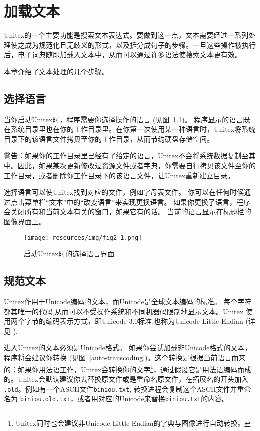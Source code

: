 \chapter{加载文本}
\label{chap-text}

\noindent Unitex的一个主要功能是搜索文本表达式。要做到这一点，文本需要经过一系列处理使之成为规范化且无歧义的形式，以及拆分成句子的步骤。一旦这些操作被执行后，电子词典随即加载入文本中，从而可以通过许多语法使搜索文本更有效。


\bigskip
\noindent 本章介绍了文本处理的几个步骤。


\section{选择语言}
\noindent 当你启动Unitex时，程序需要你选择操作的语言 (见图~\ref{fig-language-selection})。 程序显示的语言既在系统目录里也在你的工作目录里。在你第一次使用某一种语言时，Unitex将系统目录下的该语言文件拷贝至你的工作目录，从而节约硬盘存储空间。


\bigskip
\noindent 警告：如果你的工作目录里已经有了给定的语言，Unitex不会将系统数据复制至其中。因此，如果某次更新修改过资源文件或者字典，你需要自行拷贝该文件至你的工作目录，或者删除你工作目录下的该语言文件，让Unitex重新建立目录。


\bigskip
\noindent 
选择语言可以使Unitex找到对应的文件，例如字母表文件。  你可以在任何时候通过点击菜单栏“文本”中的“改变语言”来实现更换语言。 如果你更换了语言，程序会关闭所有和当前文本有关的窗口，如果它有的话。 当前的语言显示在标题栏的图像界面上。


\begin{figure}[!h]
\begin{center}
\texttt{[image: resources/img/fig2-1.png]}
\caption{\label{fig-language-selection}启动Unitex时的选择语言界面}
\end{center}
\end{figure}


\section{规范文本}
\label{section-conversion-texte-unicode}
Unitex作用于Unicode编码的文本，而Unicode是全球文本编码的标准。 每个字符都其唯一的代码,从而可以不受操作系统和不同机器码限制地显示文本。Unitex 使用两个字节的编码表示方式，即Unicode 3.0标准,也称为Unicode Little-Endian (详见
\cite{UNICODE}).

\bigskip
{}
\noindent 进入Unitex的文本必须是Unicode格式。 如果你尝试加载非Unicode格式的文本，程序将会建议你转换 
(见图~\ref{auto-transcoding})。这个转换是根据当前语言而来的：如果你用法语工作，Unitex会转换你的文字\footnote{Unitex同时也会建议非Unicode Little-Endian的字典与图像进行自动转换。}，通过假设它是用法语编码而成的。Unitex会默认建议你去替换原文件或是重命名原文件，在拓展名的开头加入
\verb$.old$。例如有一个ASCII文件\verb$biniou.txt$,
转换进程会复制这个ASCII文件并重命名为 \verb$biniou.old.txt$，或者用对应的Unicode来替换\verb$biniou.txt$的内容。

